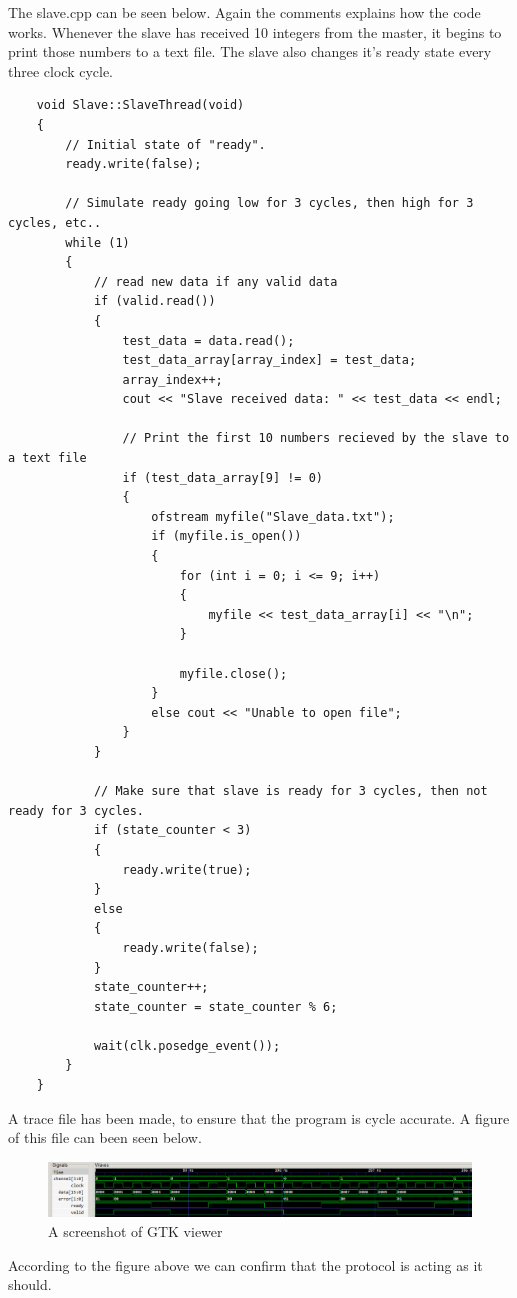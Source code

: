 The slave.cpp can be seen below. Again the comments explains how the code works. Whenever the slave has received 10 integers from the master, it begins to print those numbers to a text file. The slave also changes it's ready state every three clock cycle.  

\begin{lstlisting}
	void Slave::SlaveThread(void)
	{
		// Initial state of "ready".
		ready.write(false);
		
		// Simulate ready going low for 3 cycles, then high for 3 cycles, etc..
		while (1)
		{
			// read new data if any valid data
			if (valid.read())
			{
				test_data = data.read();
				test_data_array[array_index] = test_data;
				array_index++;
				cout << "Slave received data: " << test_data << endl;
				
				// Print the first 10 numbers recieved by the slave to a text file
				if (test_data_array[9] != 0)
				{
					ofstream myfile("Slave_data.txt");
					if (myfile.is_open())
					{
						for (int i = 0; i <= 9; i++)
						{
							myfile << test_data_array[i] << "\n";
						}
						
						myfile.close();
					}
					else cout << "Unable to open file";
				}
			}
			
			// Make sure that slave is ready for 3 cycles, then not ready for 3 cycles.
			if (state_counter < 3)
			{
				ready.write(true);
			}
			else
			{
				ready.write(false);
			}
			state_counter++;
			state_counter = state_counter % 6;
			
			wait(clk.posedge_event());
		}
	}
\end{lstlisting}

A trace file has been made, to ensure that the program is cycle accurate. A figure of this file can been seen below.

\begin{figure}[H]
	\centering
	\includegraphics[width=\textwidth]{Images/GTK_3_4.png}
	\caption{A screenshot of GTK viewer}
	\label{fig:GTK_Viewer}
\end{figure}

According to the figure above we can confirm that the protocol is acting as it should.
